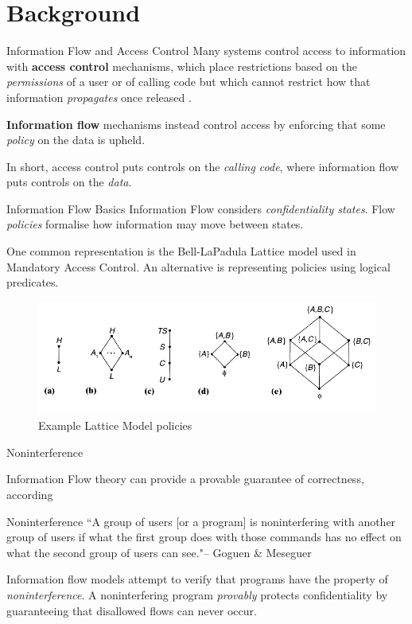\section{Background}

\begin{frame}{Information Flow and Access Control}
	Many systems control access to information with \textbf{access control} mechanisms, which place restrictions based on the \textit{permissions} of a user or of calling code but which cannot restrict how that information \textit{propagates} once released \cite{ifbackground:sabelfeld}.
	
	\textbf{Information flow} mechanisms instead control access by enforcing that some \textit{policy} on the data is upheld.
	
	In short, access control puts controls on the \textit{calling code}, where information flow puts controls on the \textit{data}.
\end{frame}

\begin{frame}{Information Flow Basics}
	Information Flow considers \textit{confidentiality states}. Flow \textit{policies} formalise how information may move between states.
	
	One common representation is the Bell-LaPadula Lattice model used in Mandatory Access Control. An alternative is representing policies using logical predicates.
	
	\begin{figure}
		\includegraphics[scale=0.45]{content/images/lattice_examples.png}
		\caption{Example Lattice Model policies \cite{ifbackground:sandhu}}
	\end{figure}
	
\end{frame}

\begin{frame}{Noninterference}
	
	Information Flow theory can provide a provable guarantee of correctness, according
	\begin{block}{Noninterference}
		``A group of users [or a program] is noninterfering with another group of users if what the first group does with those commands has no effect on what the second group of users can see."\newline \tiny{-- Goguen \& Meseguer} \cite{ifbackground:goguen}
	\end{block}
	
	Information flow models attempt to verify that programs have the property of \textit{noninterference}. A noninterfering program \textit{provably} protects confidentiality by guaranteeing that disallowed flows can never occur.
\end{frame}

